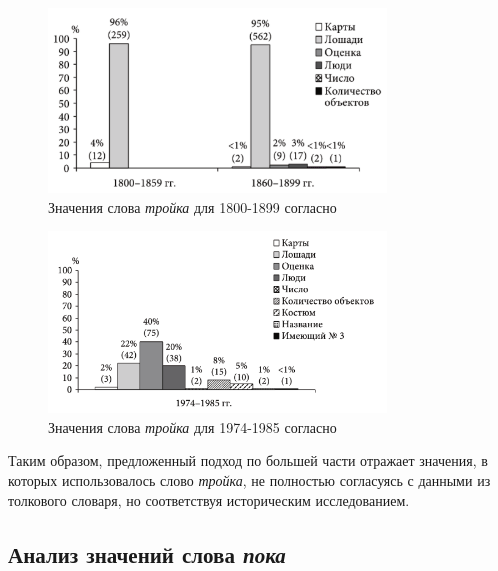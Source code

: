 \documentclass[LI,VKR]{HSEUniversity}
\begin{document}
\noindent %
\begin{figure}[H]
    \centering %
    \includegraphics[width=0.8\textwidth]{img/book/trojka/1800-1899}
    \caption{Значения слова \textit{тройка} для 1800-1899 согласно~\cite{TwoCenturies}}
    \label{fig:TwoCenturiesTrojka1}
\end{figure}

\begin{figure}[H]
    \centering %
    \includegraphics[width=0.8\textwidth]{img/book/trojka/1974-1985}
    \caption{Значения слова \textit{тройка} для 1974-1985 согласно~\cite{TwoCenturies}}
    \label{fig:TwoCenturiesTrojka2}
\end{figure}

Таким образом, предложенный подход по большей части отражает значения, в которых использовалось
слово \textit{тройка}, не полностью согласуясь с данными из толкового словаря,
но соответствуя историческим исследованием.

\subsection*{Анализ значений слова \textit{пока}}
\end{document}
